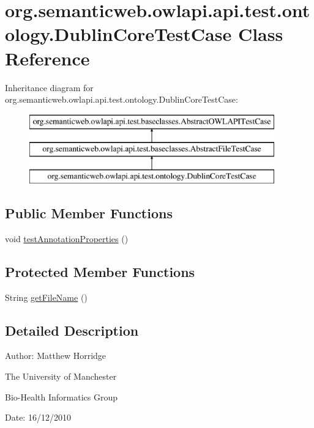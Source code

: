 \hypertarget{classorg_1_1semanticweb_1_1owlapi_1_1api_1_1test_1_1ontology_1_1_dublin_core_test_case}{\section{org.\-semanticweb.\-owlapi.\-api.\-test.\-ontology.\-Dublin\-Core\-Test\-Case Class Reference}
\label{classorg_1_1semanticweb_1_1owlapi_1_1api_1_1test_1_1ontology_1_1_dublin_core_test_case}
}
Inheritance diagram for org.\-semanticweb.\-owlapi.\-api.\-test.\-ontology.\-Dublin\-Core\-Test\-Case\-:\begin{figure}[H]
\begin{center}
\leavevmode
\includegraphics[height=3.000000cm]{classorg_1_1semanticweb_1_1owlapi_1_1api_1_1test_1_1ontology_1_1_dublin_core_test_case}
\end{center}
\end{figure}
\subsection*{Public Member Functions}
\begin{DoxyCompactItemize}
\item 
void \hyperlink{classorg_1_1semanticweb_1_1owlapi_1_1api_1_1test_1_1ontology_1_1_dublin_core_test_case_a4514942cdd6a123dadd0d15a8061f341}{test\-Annotation\-Properties} ()
\end{DoxyCompactItemize}
\subsection*{Protected Member Functions}
\begin{DoxyCompactItemize}
\item 
String \hyperlink{classorg_1_1semanticweb_1_1owlapi_1_1api_1_1test_1_1ontology_1_1_dublin_core_test_case_abc54f4c39833f8e1bee845c2865929d5}{get\-File\-Name} ()
\end{DoxyCompactItemize}


\subsection{Detailed Description}
Author\-: Matthew Horridge\par
 The University of Manchester\par
 Bio-\/\-Health Informatics Group\par
 Date\-: 16/12/2010 

